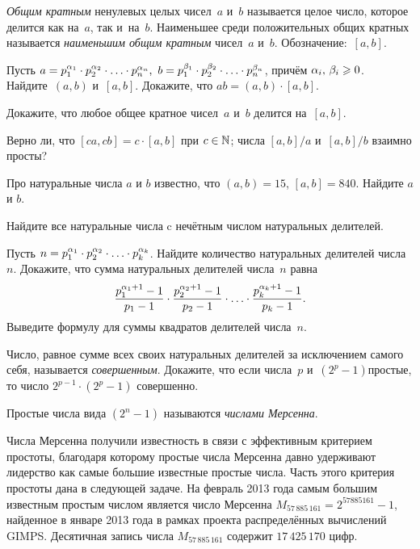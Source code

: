 \documentclass[a4paper,12pt]{article}
\begin{document}
\emph{Общим кратным} ненулевых целых чисел~$a$ и~$b$ называется целое число, которое делится как на~$a$, так и~на~$b$. Наименьшее среди положительных общих кратных называется \emph{наименьшим общим кратным} чисел~$a$ и~$b$. Обозначение:~$[a,b]$.

Пусть $a=p_1^{\alpha_1}\cdot p_2^{\alpha_2}\cdot\ldots\cdot p_n^{\alpha_n},\,\,b=p_1^{\beta_1}\cdot p_2^{\beta_2}\cdot\ldots\cdot p_n^{\beta_n}$, причём $\alpha_i,\,\beta_i\geqslant0$.\\
Найдите~$(a,b)$ и~$[a,b]$.
Докажите, что $ab=(a,b)\cdot[a,b]$.

Докажите, что любое общее кратное чисел~$a$ и~$b$ делится на~$[a,b]$.

Верно ли, что
$[ca,cb]=c\cdot[a,b]$ при $c\in\mathbb{N}$;
числа $[a,b]/a$ и~$[a,b]/b$ взаимно просты?

Про натуральные числа $a$ и $b$ известно, что $(a,b) = 15$, $[a,b] = 840$. Найдите $a$ и $b$.


Найдите все натуральные числа c нечётным числом натуральных делителей.


\vfill
{}
\newpage

Пусть $n=p_1^{\alpha_1}\cdot p_2^{\alpha_2}\cdot\ldots\cdot p_k^{\alpha_k}$.
Найдите количество натуральных делителей числа~$n$.
Докажите, что сумма натуральных делителей числа~$n$ равна
\[
\frac{p_1^{\alpha_1+1}-1}{p_1-1}\cdot\frac{p_2^{\alpha_2+1}-1}{p_2-1}\cdot\ldots\cdot \frac{p_k^{\alpha_k+1}-1}{p_k-1}.
\]
Выведите формулу для суммы квадратов делителей числа~$n$.



Число, равное сумме всех своих натуральных делителей за исключением самого себя, называется \emph{совершенным}. Докажите, что если числа~$p$ и~$(2^p-1)$\т простые, то число $2^{p-1}\cdot(2^p-1)$ совершенно.

Простые числа вида $(2^n-1)$ называются \emph{числами Мерсенна}.

{\small
Числа Мерсенна получили известность в связи с эффективным критерием простоты, благодаря которому простые числа Мерсенна давно удерживают лидерство как самые большие известные простые числа. Часть этого критерия простоты дана в следующей задаче. На февраль 2013 года самым большим известным простым числом является число Мерсенна $M_{57\,885\,161}=2^{57885161}-1$, найденное в январе 2013 года в рамках проекта распределённых вычислений GIMPS. Десятичная запись числа $M_{57\,885\,161}$ содержит $17\,425\,170$ цифр.
\par}
\end{document}
